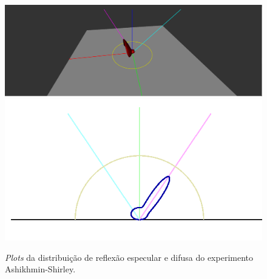 \begin{figure}[H]
    \caption{\small{\textit{Plots} da distribuição de reflexão especular e difusa do experimento Ashikhmin-Shirley.}}
    \label{fig-ashikhmin-shirley-close-to-original-plots}
    \vspace{42px}
  \includegraphics[width=\linewidth]{./Imagens/brdfs/ashikhmin-shirley-close-to-original-3D-plot}
\endminipage\hfill
{}
  \includegraphics[width=\linewidth]{./Imagens/brdfs/ashikhmin-shirley-close-to-original-polar-plot.png}
\endminipage\hfill
\end{figure}

